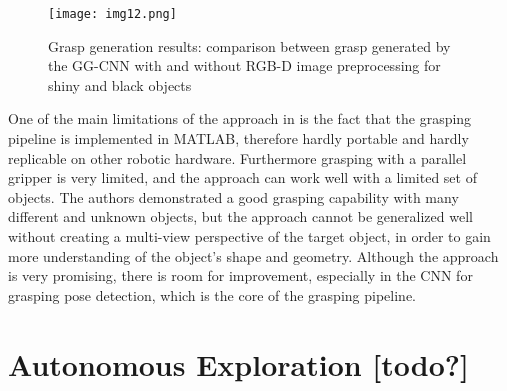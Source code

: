 \begin{figure}[H]
	\centering
	\texttt{[image: img12.png]}
	\captionsetup{width=1\linewidth}
	\caption{Grasp generation results: comparison between grasp generated by the GG-CNN
		with and without RGB-D image preprocessing for shiny and black objects
		\cite{sayour2022unknowngrasping}}
	\label{fig:img12}
\end{figure}

One of the main limitations of the approach in \cite{sayour2022unknowngrasping} is the fact
that the grasping pipeline is implemented in MATLAB, therefore hardly portable and hardly
replicable on other robotic hardware. Furthermore grasping with a parallel gripper is
very limited, and the approach can work well with a limited set of objects. The authors
demonstrated a good grasping capability with many different and unknown objects, but
the approach cannot be generalized well without creating a multi-view perspective of
the target object, in order to gain more understanding of the object's shape and
geometry. Although the approach is very promising, there is room for improvement,
especially in the CNN for grasping pose detection, which is the core of the grasping pipeline.




\section{Autonomous Exploration [todo?]}
